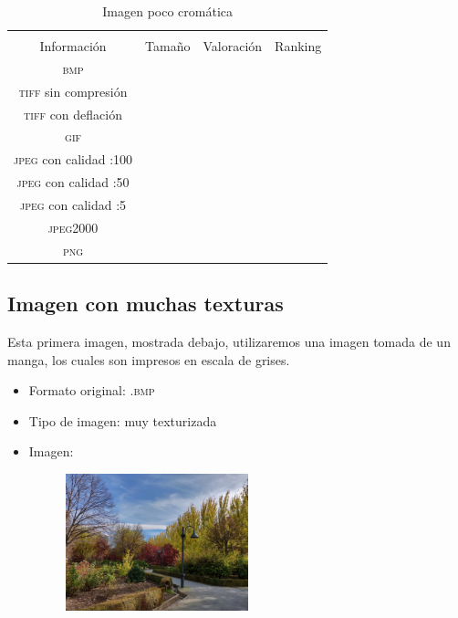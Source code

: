 \documentclass[11pt,a4paper]{article}
\begin{document}
\begin{table}[H]
\centering
\begin{tabular}{|c|c|c|c|}
\hline
\diagbox[width=15em]{\textit{Códec}/Formato}{\\Información} & Tamaño & Valoración & Ranking \\
\hline
\textsc{bmp} &  &  &  \\ \hline
\textsc{tiff} sin compresión &  &  &  \\ \hline
\textsc{tiff} con deflación &  &  &  \\ \hline
\textsc{gif} &  &  &  \\ \hline
\textsc{jpeg} con calidad :100 &  &  &  \\ \hline
\textsc{jpeg} con calidad :50 &  &  &  \\ \hline
\textsc{jpeg} con calidad :5 &  &  &  \\ \hline
\textsc{jpeg2000} &  &  &  \\ \hline
\textsc{png} &  &  &  \\ \hline
\end{tabular}
\caption{Imagen poco cromática}
\label{tab:my-table}
\end{table}


\subsection{Imagen con muchas texturas}

Esta primera imagen, mostrada debajo, utilizaremos una imagen tomada de un manga, los cuales son impresos en escala de grises.

\begin{itemize}
	\item Formato original: \textsc{.bmp}
	\item Tipo de imagen: muy texturizada
	\item Imagen:
		\begin{figure}[H]
		\centering
			\includegraphics[width=0.5\textwidth]{Fotos/texturas.jpg}
		\end{figure}	
\end{itemize}
\end{document}
